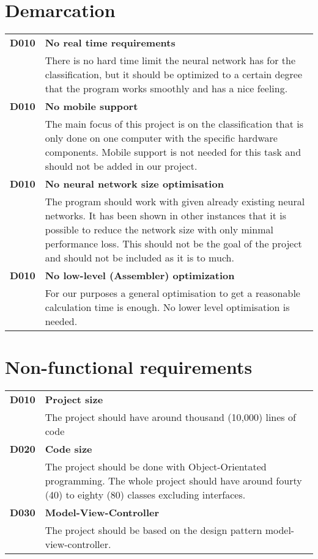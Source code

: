 \documentclass[parskip=full]{scrartcl}
\begin{document}
\section{Demarcation}
\begin{tabular}{p{2cm}p{12cm}}
\textbf{D010} & \textbf{No real time requirements}\\
& There is no hard time limit the neural network has for the classification, but it should be optimized  to a certain degree that the program works smoothly and has a nice feeling. \\
\textbf{D010} & \textbf{No mobile support}\\
& The main focus of this project is on the classification that is only done on one computer with the specific hardware components. Mobile support is not needed for this task and should not be added in our project. \\
\textbf{D010} & \textbf{No neural network size optimisation}\\
& The program should work with given already existing neural networks. It has been shown in other instances that it is possible to reduce the network size with only minmal performance loss. This should not be the goal of the project and should not be included as it is to much. \\
\textbf{D010} & \textbf{No low-level (Assembler) optimization}\\
& For our purposes a general optimisation to get a reasonable calculation time is enough. No lower level optimisation is needed. \\
\end{tabular}

\section{Non-functional requirements}
\begin{tabular}{p{2cm}p{12cm}}
\textbf{D010} & \textbf{Project size}\\
& The project should have around thousand (10,000) lines of code \\
\textbf{D020} & \textbf{Code size}\\
& The project should be done with Object-Orientated programming. The whole project should have around fourty (40) to eighty (80) classes excluding interfaces. \\
\textbf{D030} & \textbf{Model-View-Controller}\\
& The project should be based on the design pattern model-view-controller. \\
\end{tabular}
\end{document}
